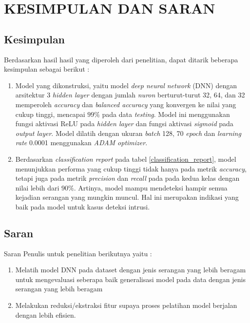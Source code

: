 \documentclass[a4paper,12pt]{report}
\begin{document}
\chapter{KESIMPULAN DAN SARAN}

\section{Kesimpulan}
Berdasarkan hasil hasil yang diperoleh dari penelitian, dapat ditarik beberapa kesimpulan sebagai berikut :
\begin{enumerate}
	\item Model yang dikonstruksi, yaitu model \textit{deep neural network} (DNN) dengan arsitektur 3 \textit{hidden layer} dengan jumlah \textit{nuron} berturut-turut 32, 64, dan 32 memperoleh \textit{accuracy} dan \textit{balanced accuracy} yang konvergen ke nilai yang cukup tinggi, mencapai $99\%$ pada data \textit{testing}. Model ini menggunakan fungsi aktivasi ReLU pada \textit{hidden layer} dan fungsi aktivasi \textit{sigmoid} pada \textit{output layer}. Model dilatih dengan ukuran \textit{batch} 128, 70 \textit{epoch} dan \textit{learning rate} 0.0001 menggunakan \textit{ADAM optimizer}.
	 
	\item Berdasarkan \textit{classification report} pada tabel \ref{classification_report}, model menunjukkan performa yang cukup tinggi tidak hanya pada metrik \textit{accuracy}, tetapi juga pada metrik \textit{precision} dan \textit{recall} pada pada kedua kelas dengan nilai lebih dari $90\%$. Artinya, model mampu mendeteksi hampir semua kejadian serangan yang mungkin muncul. Hal ini merupakan indikasi yang baik pada model untuk kasus deteksi intrusi.
\end{enumerate}
\section{Saran}
Saran Penulis untuk penelitian berikutnya yaitu :
\begin{enumerate}
	\item Melatih model DNN pada dataset dengan jenis serangan yang lebih beragam untuk mengevaluasi seberapa baik generalisasi model pada data dengan jenis serangan yang lebih beragam
	
	\item Melakukan reduksi/ekstraksi fitur supaya proses pelatihan model berjalan dengan lebih efisien.
\end{enumerate}
\end{document}
